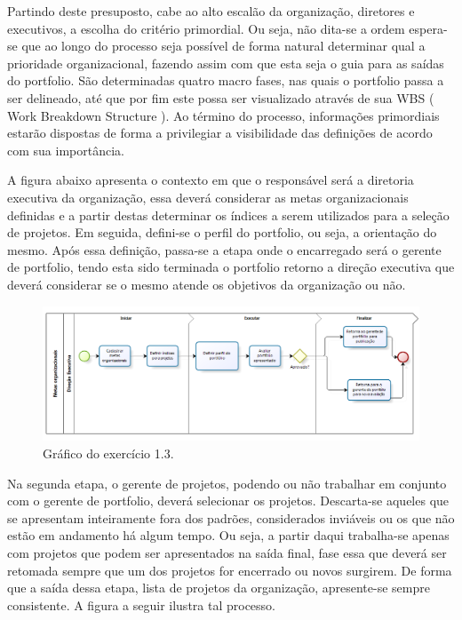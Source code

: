 \documentclass[12pt,a4paper,ruledheader,tocpage=prefix,floatnumber=continuous,pagestart=folhaderosto,font=times]{abnt}
\begin{document}
Partindo deste presuposto, cabe ao alto escalão da organização, diretores e executivos, a escolha do critério primordial. Ou seja, não dita-se a ordem 
espera-se que ao longo do processo seja possível de forma natural determinar qual a prioridade organizacional, fazendo assim com que esta seja o guia para 
as saídas do portfolio. São determinadas quatro macro fases, nas quais o portfolio passa a ser delineado, até que por fim este possa ser visualizado através 
de sua WBS ( Work Breakdown Structure ). Ao término do processo, informações primordiais estarão dispostas de forma a privilegiar a visibilidade das 
definições de acordo com sua importância.

A figura abaixo apresenta o contexto em que o responsável será a diretoria executiva da organização, essa deverá considerar as metas organizacionais 
definidas e a partir destas determinar os índices a serem utilizados para a seleção de projetos. Em seguida, defini-se o perfil do portfolio, ou seja, a 
orientação do mesmo. Após essa definição, passa-se a etapa onde o encarregado será o gerente de portfolio, tendo esta sido terminada o portfolio retorno 
a direção executiva que deverá considerar se o mesmo atende os objetivos da organização ou não.

\begin{figure}[H]
\centering
\includegraphics[width=.9\textwidth]{DirecaoExecutiva.png}
\caption{Gráfico do exercício 1.3.}
\end{figure}

Na segunda etapa, o gerente de projetos, podendo ou não trabalhar em conjunto com o gerente de portfolio, deverá selecionar os projetos. Descarta-se 
aqueles que se apresentam inteiramente fora dos padrões, considerados inviáveis ou os que não estão em andamento há algum tempo. Ou seja, a partir daqui 
trabalha-se apenas com projetos que podem ser apresentados na saída final, fase essa que deverá ser retomada sempre que um dos projetos for encerrado ou 
novos surgirem. De forma que a saída dessa etapa, lista de projetos da organização, apresente-se sempre consistente. A figura a seguir ilustra tal 
processo.
\end{document}
